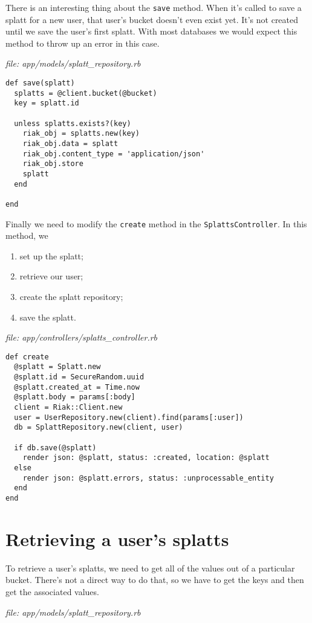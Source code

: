 \documentclass{article}
\begin{document}
There is an interesting thing about the \texttt{save} method.  When it's called to save a splatt for a new user, that user's bucket doesn't even exist yet.  It's not created until we save the user's first splatt.  With most databases we would expect this method to throw up an error in this case.

\emph{file: app/models/splatt\_repository.rb}
\begin{verbatim}
def save(splatt)
  splatts = @client.bucket(@bucket)
  key = splatt.id

  unless splatts.exists?(key)
    riak_obj = splatts.new(key)
    riak_obj.data = splatt
    riak_obj.content_type = 'application/json'
    riak_obj.store
    splatt
  end

end
\end{verbatim}

Finally we need to modify the \texttt{create} method in the \texttt{SplattsController}.  In this method, we

\begin{enumerate}
	\item set up the splatt;
	\item retrieve our user;
	\item create the splatt repository;
	\item save the splatt.
\end{enumerate}

\emph{file: app/controllers/splatts\_controller.rb}
\begin{verbatim}
def create
  @splatt = Splatt.new
  @splatt.id = SecureRandom.uuid
  @splatt.created_at = Time.now
  @splatt.body = params[:body]
  client = Riak::Client.new
  user = UserRepository.new(client).find(params[:user])
  db = SplattRepository.new(client, user)

  if db.save(@splatt)
    render json: @splatt, status: :created, location: @splatt
  else
    render json: @splatt.errors, status: :unprocessable_entity
  end
end
\end{verbatim}

\section{Retrieving a user's splatts}
To retrieve a user's splatts, we need to get all of the values out of a particular bucket.  There's not a direct way to do that, so we have to get the keys and then get the associated values.

\emph{file: app/models/splatt\_repository.rb}
\end{document}
